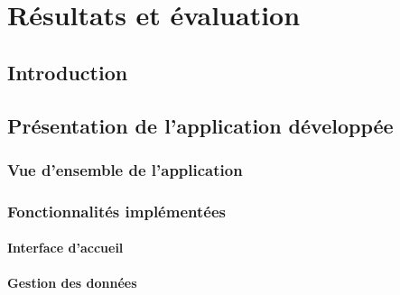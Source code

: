 
\chapter{Résultats et évaluation}
\label{chap:resultats}

\section{Introduction}


\section{Présentation de l'application développée}


\subsection{Vue d'ensemble de l'application}



\subsection{Fonctionnalités implémentées}


\subsubsection{Interface d'accueil}


\subsubsection{Gestion des données}


